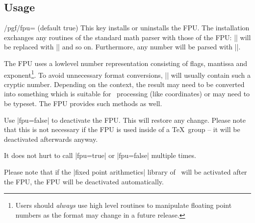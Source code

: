 \subsection{Usage}
\begin{key}{/pgf/fpu= (default true)}
  This key installs or uninstalls the FPU. The installation exchanges
  any routines of the standard math parser with those of the FPU:
  |\pgfmathadd| will be replaced with |\pgfmathfloatadd| and so
  on. Furthermore, any number will be parsed with
  |\pgfmathfloatparsenumber|. 

\begin{codeexample}[]
\pgfmathresult
\end{codeexample}
  \noindent The FPU uses a lowlevel number representation consisting
  of flags, mantissa and exponent\footnote{Users should \emph{always}
    use high level routines to manipulate floating point numbers as
    the format may change in a future release.}. To avoid unnecessary
  format conversions, |\pgfmathresult| will usually contain such a
  cryptic number. Depending on the context, the result may need to be
  converted into something which is suitable for \pgfname\ processing
  (like coordinates) or may need to be typeset. The FPU provides such
  methods as well. 


  Use |fpu=false| to deactivate the FPU. This will restore any
  change. Please note that this is not necessary if the FPU is used
  inside of a \TeX\ group -- it will be deactivated afterwards
  anyway. 

  It does not hurt to call |fpu=true| or |fpu=false| multiple times. 

  Please note that if the |fixed point arithmetics| library of
  \pgfname\ will be activated after the FPU, the FPU will be
  deactivated automatically. 
\end{key}

